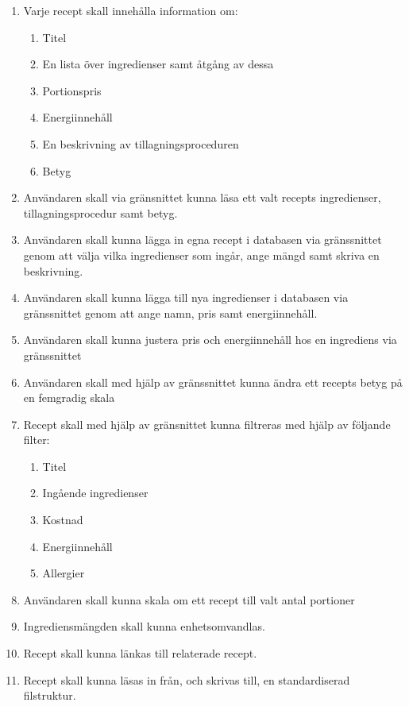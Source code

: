\renewcommand{\labelenumii}{\theenumii}
\renewcommand{\theenumii}{\theenumi.\arabic{enumii}.}

\begin{enumerate}
\item Varje recept skall innehålla information om:
  \begin{enumerate}
    \item Titel
    \item En lista över ingredienser samt åtgång av dessa
    \item Portionspris
    \item Energiinnehåll
    \item En beskrivning av tillagningsproceduren
    \item Betyg
  \end{enumerate}
\item Användaren skall via gränsnittet kunna läsa ett valt recepts ingredienser, tillagningsprocedur samt betyg.
\item Användaren skall kunna lägga in egna recept i databasen via gränssnittet genom att välja vilka ingredienser som ingår, ange mängd samt skriva en beskrivning.
\item Användaren skall kunna lägga till nya ingredienser i databasen via gränssnittet genom att ange namn, pris samt energiinnehåll.
\item Användaren skall kunna justera pris och energiinnehåll hos en ingrediens via gränssnittet
\item Användaren skall med hjälp av gränssnittet kunna ändra ett recepts betyg på en femgradig skala
\item Recept skall med hjälp av gränsnittet kunna filtreras med hjälp av följande filter:
  \begin{enumerate}
    \item Titel
    \item Ingående ingredienser
    \item Kostnad
    \item Energiinnehåll
    \item Allergier
  \end{enumerate}
\item Användaren skall kunna skala om ett recept till valt antal portioner
\item Ingrediensmängden skall kunna enhetsomvandlas.
\item Recept skall kunna länkas till relaterade recept.
  \item Recept skall kunna läsas in från, och skrivas till, en standardiserad filstruktur.
\end{enumerate}
